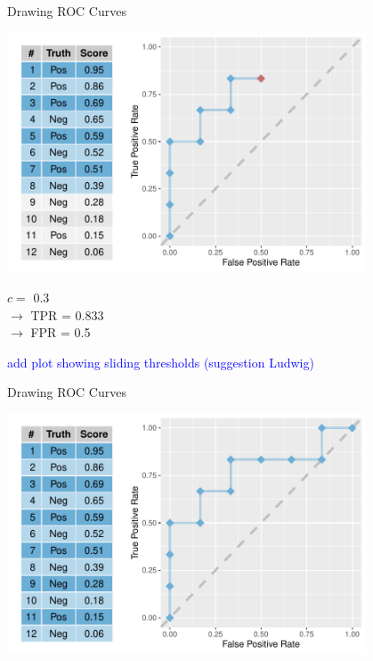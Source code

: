 \begin{vbframe}{Drawing ROC Curves}

\begin{knitrout}\scriptsize
{}\color{fgcolor}

{
\includegraphics[width=0.8\textwidth]{figure/eval_mclass_roc_sp_10} 
}

\end{knitrout}

\vfill

\begin{minipage}[b]{0.3\textwidth}
  $c =$ 0.3\\ 
  $\rightarrow$ TPR = 0.833 \\
  $\rightarrow$ FPR = 0.5
\end{minipage}%
\begin{minipage}[b]{0.7\textwidth}
  \textcolor{blue}{add plot showing sliding thresholds (suggestion Ludwig)}
\end{minipage}

\end{vbframe}


\begin{vbframe}{Drawing ROC Curves}

\begin{knitrout}\scriptsize
{}\color{fgcolor}

{
\includegraphics[width=0.8\textwidth]{figure/eval_mclass_roc_sp_11}
}

\end{knitrout}

\end{vbframe}

